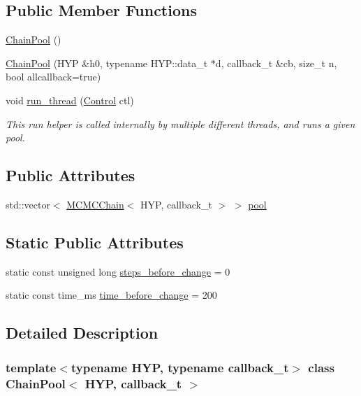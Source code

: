 \subsection*{Public Member Functions}
\begin{DoxyCompactItemize}
\item 
\hyperlink{class_chain_pool_ae8795a9a7c0fff45c82334fa821c8c3c}{Chain\+Pool} ()
\item 
\hyperlink{class_chain_pool_a7794efde5588ecbf3603170d6226cd6f}{Chain\+Pool} (H\+YP \&h0, typename H\+Y\+P\+::data\+\_\+t $\ast$d, callback\+\_\+t \&cb, size\+\_\+t n, bool allcallback=true)
\item 
void \hyperlink{class_chain_pool_a6bbed8ddd9a46f5821bfcb1d10f9ac9b}{run\+\_\+thread} (\hyperlink{struct_control}{Control} ctl)
\begin{DoxyCompactList}\small\item\em This run helper is called internally by multiple different threads, and runs a given pool. \end{DoxyCompactList}\end{DoxyCompactItemize}
\subsection*{Public Attributes}
\begin{DoxyCompactItemize}
\item 
std\+::vector$<$ \hyperlink{class_m_c_m_c_chain}{M\+C\+M\+C\+Chain}$<$ H\+YP, callback\+\_\+t $>$ $>$ \hyperlink{class_chain_pool_af89400f6e9a2312fe2ee7873745a6e91}{pool}
\end{DoxyCompactItemize}
\subsection*{Static Public Attributes}
\begin{DoxyCompactItemize}
\item 
static const unsigned long \hyperlink{class_chain_pool_a143f3e4f9b60c03c67ffbc2db3e57d53}{steps\+\_\+before\+\_\+change} = 0
\item 
static const time\+\_\+ms \hyperlink{class_chain_pool_a1ff48aa1e09a9a31871dec05d3c0e9d3}{time\+\_\+before\+\_\+change} = 200
\end{DoxyCompactItemize}


\subsection{Detailed Description}
\subsubsection*{template$<$typename H\+YP, typename callback\+\_\+t$>$\newline
class Chain\+Pool$<$ H\+Y\+P, callback\+\_\+t $>$}

